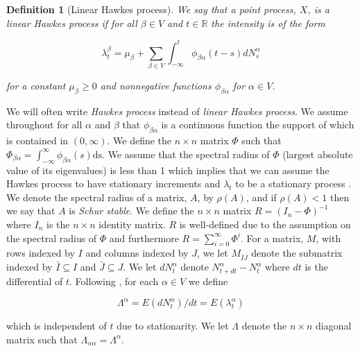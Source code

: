 \documentclass[accepted]{uai2021} %
\newtheorem{defn}[thm]{Definition}
\newcommand{\ds}{\text{ds}}
\begin{document}
\begin{defn}[Linear Hawkes process]
	We say that a point process, $X$, is a \emph{linear Hawkes process} if for 
	all $\beta\in V$ and $t\in \mathbb{R}$ the 
	intensity is of the form
	
	$$
	\lambda_t^\beta = \mu_\beta + \sum_{\beta \in V} \int_{-\infty}^{t} 
	\phi_{\beta\alpha}(t - s) d 
	N_s^\alpha
	$$
	
	\noindent for a constant $\mu_\beta \geq 0$ and nonnegative functions 
	$\phi_{\beta\alpha}$ for $\alpha \in V$.
	\label{def:hawProc}
\end{defn}

We will often write \emph{Hawkes process} instead of \emph{linear Hawkes 
process}. 
We assume throughout for all 
$\alpha$ and $\beta$ that $\phi_{\beta\alpha}$ is a continuous 
function the support of which is contained in $(0, \infty)$. We define the 
$n\times n$ matrix $\Phi$ such that $\Phi_{\beta\alpha} = 
\int_{-\infty}^\infty 
\phi_{\beta\alpha}(s) \ds$. We assume that the spectral radius of $\Phi$ 
(largest 
absolute value of its eigenvalues) is less than 1 which implies that we can 
assume the Hawkes process to have stationary increments and $\lambda_t$ to be a 
stationary process \citep{jovanovic2015, bacry2016}. We denote the spectral 
radius of a matrix, $A$, by $\rho(A)$, and if $\rho(A) < 1$ then we say that 
$A$ is \emph{Schur stable}.
We define the $n\times n$ matrix $R=(I_n - \Phi)^{-1}$ where $I_n$ is the 
$n\times n$ identity matrix. $R$ is well-defined due to the assumption on 
the spectral radius of $\Phi$ and furthermore $R = \sum_{i=0}^\infty \Phi^i$. 
For a matrix, $M$, with rows indexed by $I$ and columns indexed by $J$, we let 
$M_{\bar{I}\bar{J}}$ denote the submatrix indexed by $\bar{I}\subseteq I$ and 
$\bar{J}\subseteq J$. We let $dN_t^\alpha$ denote $N_{t+dt}^\alpha - 
N_t^\alpha$ where $dt$ is the 
differential of $t$. 
Following \cite{hawkesJRSSB1971}, for each $\alpha\in V$ we define

$$
\Lambda^\alpha = E(dN_t^\alpha)/dt = E(\lambda_t^\alpha)
$$

\noindent which is independent of $t$ due to stationarity. We let $\Lambda$ 
denote the $n\times n$ diagonal matrix such that $\Lambda_{\alpha\alpha} = 
\Lambda^\alpha$.
\end{document}
